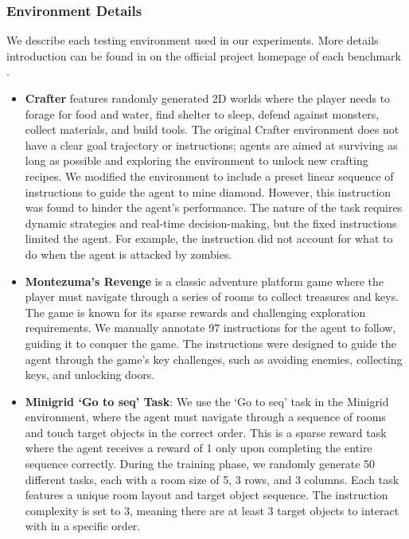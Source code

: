 \documentclass{article}
\theoremstyle{plain}
\theoremstyle{definition}
\theoremstyle{remark}
\begin{document}
\subsubsection{Environment Details}
We describe each testing environment used in our experiments. More details introduction can be found in on the official project homepage of each benchmark \citep{chevalier2018babyai, Bellemare2012TheAL, Hafner2021BenchmarkingTS}. 
\begin{itemize}
    \item \textbf{Crafter} features randomly generated 2D worlds where the player needs to forage for food and water, find shelter to sleep, defend against monsters, collect materials, and build tools. The original Crafter environment does not have a clear goal trajectory or instructions; agents are aimed at surviving as long as possible and exploring the environment to unlock new crafting recipes. We modified the environment to include a preset linear sequence of instructions to guide the agent to mine diamond. However, this instruction was found to hinder the agent's performance. The nature of the task requires dynamic strategies and real-time decision-making, but the fixed instructions limited the agent. For example, the instruction did not account for what to do when the agent is attacked by zombies.
    \item \textbf{Montezuma's Revenge} is a classic adventure platform game where the player must navigate through a series of rooms to collect treasures and keys. The game is known for its sparse rewards and challenging exploration requirements. We manually annotate 97 instructions for the agent to follow, guiding it to conquer the game. The instructions were designed to guide the agent through the game's key challenges, such as avoiding enemies, collecting keys, and unlocking doors.
    \item \textbf{Minigrid `Go to seq' Task}: We use the `Go to seq' task in the Minigrid environment, where the agent must navigate through a sequence of rooms and touch target objects in the correct order. This is a sparse reward task where the agent receives a reward of 1 only upon completing the entire sequence correctly. During the training phase, we randomly generate 50 different tasks, each with a room size of 5, 3 rows, and 3 columns. Each task features a unique room layout and target object sequence. The instruction complexity is set to 3, meaning there are at least 3 target objects to interact with in a specific order.
\end{itemize}
\end{document}
